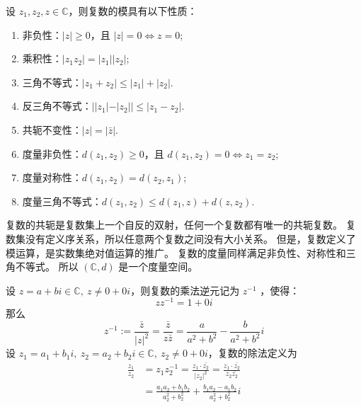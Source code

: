 \begin{proposition}[复数的模的性质]
    设 $z_1,z_2,z\in\mathbb{C}$，则复数的模具有以下性质：
    \begin{enumerate}
        \item 非负性：$|z|\ge 0$，且 $|z|=0 \Leftrightarrow z=0$;
        \item 乘积性：$|z_1 z_2| = |z_1| |z_2|$;
        \item 三角不等式：$|z_1 + z_2| \le |z_1| + |z_2|$.
        \item 反三角不等式：$||z_1| - |z_2|| \le |z_1 - z_2|$.
        \item 共轭不变性：$|z| = |\bar{z}|$.
        \item 度量非负性：$d(z_1,z_2) \ge 0$，且 $d(z_1,z_2)=0 \Leftrightarrow z_1=z_2$;
        \item 度量对称性：$d(z_1,z_2) = d(z_2,z_1)$;
        \item 度量三角不等式：$d(z_1,z_2) \le d(z_1,z) + d(z,z_2)$.
    \end{enumerate}
\end{proposition}

\begin{note}
    复数的共轭是复数集上一个自反的双射，任何一个复数都有唯一的共轭复数。
    复数集没有定义序关系，所以任意两个复数之间没有大小关系。
    但是，复数定义了模运算，是实数集绝对值运算的推广。
    复数的度量同样满足非负性、对称性和三角不等式。
    所以 $(\mathbb{C},d)$ 是一个度量空间。
\end{note}
\vspace{1em}

\begin{definition}[复数的乘法逆元与除法]
    设 $z=a+bi\in\mathbb{C},\ z\neq 0+0i$，则复数的乘法逆元记为 $z^{-1}$ ，使得：
    \[
        z z^{-1} = 1 + 0i
    \]
    那么
    \[
        z^{-1} := \frac{\bar{z}}{|z|^2} = \frac{\bar{z}}{z\bar{z}} = \frac{a}{a^2+b^2} - \frac{b}{a^2+b^2}i
    \]
    设 $z_1=a_1+b_1i,\ z_2=a_2+b_2i\in\mathbb{C},\ z_2\neq 0+0i$，复数的除法定义为
    \begin{align*}
        \frac{z_1}{z_2} &= z_1 z_2^{-1} = \frac{z_1 \cdot\bar{z_2}}{|z_2|^2}= \frac{z_1 \cdot\bar{z_2}}{z_2 \bar{z_2}} \\
        &= \frac{a_1 a_2 + b_1 b_2}{a_2^2 + b_2^2} + \frac{b_1 a_2 - a_1 b_2}{a_2^2 + b_2^2}i
    \end{align*}
\end{definition}

\vspace{1em}

